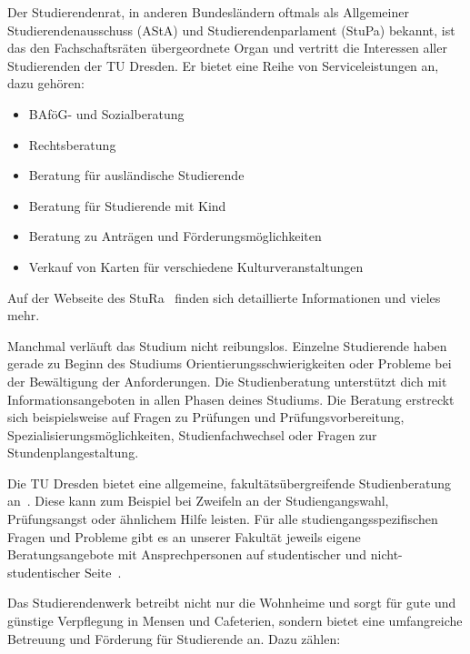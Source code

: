 \label{sec:stura}
Der Studierendenrat, in anderen Bundesländern oftmals als Allgemeiner Studierendenausschuss (AStA) und Studierendenparlament (StuPa) bekannt, ist das den Fachschaftsräten übergeordnete Organ und vertritt die Interessen aller Studierenden der TU Dresden. Er bietet eine Reihe von Serviceleistungen an, dazu gehören:
\begin{itemize}
\item BAföG- und Sozialberatung
\item Rechtsberatung
\item Beratung für ausländische Studierende
\item Beratung für Studierende mit Kind
\item Beratung zu Anträgen und Förderungsmöglichkeiten
\item Verkauf von Karten für verschiedene Kulturveranstaltungen
\end{itemize}

Auf der Webseite des StuRa~ finden sich detaillierte Informationen und vieles mehr.


\pagebreak

Manchmal verläuft das Studium nicht reibungslos.
Einzelne Studierende haben gerade zu Beginn des Studiums Orientierungsschwierigkeiten oder Probleme bei der Bewältigung der Anforderungen.
Die Studienberatung unterstützt dich mit Informationsangeboten in allen Phasen deines Studiums.
Die Beratung erstreckt sich beispielsweise auf Fragen zu Prüfungen und Prüfungsvorbereitung, Spezialisierungsmöglichkeiten, Studienfachwechsel oder Fragen zur Stundenplangestaltung.

Die TU Dresden bietet eine allgemeine, fakultätsübergreifende Studienberatung an~. Diese kann zum Beispiel bei Zweifeln an der Studiengangswahl, Prüfungsangst oder ähnlichem Hilfe leisten. Für alle studiengangsspezifischen Fragen und Probleme gibt es an unserer Fakultät jeweils eigene Beratungsangebote mit Ansprechpersonen auf studentischer und nicht-studentischer Seite~.

\label{sec:stuwe}
Das Studierendenwerk betreibt nicht nur die Wohnheime und sorgt für gute und günstige Verpflegung in Mensen und Cafeterien, sondern bietet eine umfangreiche Betreuung und Förderung für Studierende an. Dazu zählen:

